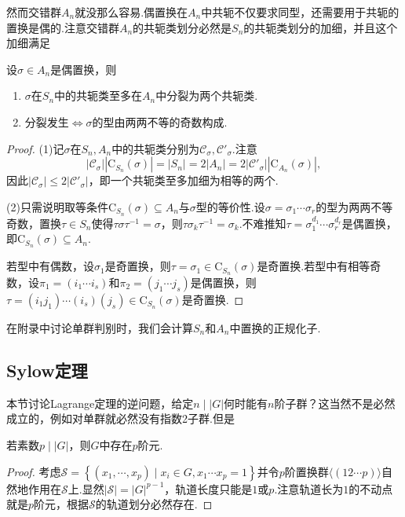 然而交错群$A_n$就没那么容易.偶置换在$A_n$中共轭不仅要求同型，还需要用于共轭的置换是偶的.注意交错群$A_n$的共轭类划分必然是$S_n$的共轭类划分的加细，并且这个加细满足
\begin{prop}
	设$\sigma\in A_n$是偶置换，则
	\begin{enumerate}
		\item $\sigma$在$S_n$中的共轭类至多在$A_n$中分裂为两个共轭类.
		\item 分裂发生$\iff$$\sigma$的型由两两不等的奇数构成.
	\end{enumerate}
\end{prop}
\begin{proof}
	\hspace*{5.4pt}(1)记$\sigma$在$S_n,A_n$中的共轭类分别为$\mathcal{C}_\sigma,\mathcal{C}'_\sigma$.注意
	\[
		|\mathcal{C}_\sigma||\mathrm{C}_{S_n}(\sigma)|=|S_n|=2|A_n|=2|\mathcal{C}'_\sigma||\mathrm{C}_{A_n}(\sigma)|,
	\]
	因此$|\mathcal{C}_\sigma|\le 2|\mathcal{C}'_{\sigma}|$，即一个共轭类至多加细为相等的两个.
	
	(2)只需说明取等条件$\mathrm{C}_{S_n}(\sigma)\subseteq A_n$与$\sigma$型的等价性.设$\sigma=\sigma_1\cdots\sigma_r$的型为两两不等奇数，置换$\tau\in S_n$使得$\tau\sigma\tau^{-1}=\sigma$，则$\tau\sigma_k\tau^{-1}=\sigma_k$.不难推知$\tau=\sigma_1^{d_1}\cdots\sigma_r^{d_r}$是偶置换，即$\mathrm{C}_{S_n}(\sigma)\subseteq A_n$.
	
	若型中有偶数，设$\sigma_1$是奇置换，则$\tau=\sigma_1\in\mathrm{C}_{S_n}(\sigma)$是奇置换.若型中有相等奇数，设$\pi_1=(i_1\cdots i_s)$和$\pi_2=(j_1\cdots j_s)$是偶置换，则$\tau=(i_1j_1)\cdots(i_s)(j_s)\in\mathrm{C}_{S_n}(\sigma)$是奇置换.
\end{proof}
\begin{remark}
	在附录中讨论单群判别时，我们会计算$S_n$和$A_n$中置换的正规化子.%
\end{remark}
\subsection{Sylow定理}
本节讨论Lagrange定理的逆问题，给定$n\mid |G|$何时能有$n$阶子群？这当然不是必然成立的，例如对单群就必然没有指数2子群.但是
\begin{thm}[(Cauchy)]
	若素数$p\mid|G|$，则$G$中存在$p$阶元.\hypertarget{thm:Cauchy}{}
\end{thm}
\begin{proof}
	考虑$\mathcal{S}=\left\{(x_1,\cdots,x_p)\mid x_i\in G,x_1\cdots x_p=1\right\}$并令$p$阶置换群$\langle (12\cdots p)\rangle $自然地作用在$\mathcal{S}$上.显然$|\mathcal{S}|=|G|^{p-1}$，轨道长度只能是$1$或$p$.注意轨道长为$1$的不动点就是$p$阶元，根据$\mathcal{S}$的轨道划分必然存在.
\end{proof}

